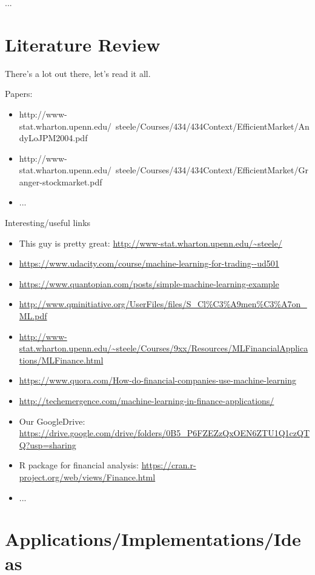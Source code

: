 \documentclass[12pt, oneside]{article}
\begin{document}
...

\section{Literature Review}

There's a lot out there, let's read it all.

Papers: 
\begin{itemize}
\item http://www-stat.wharton.upenn.edu/~steele/Courses/434/434Context/EfficientMarket/AndyLoJPM2004.pdf

\item http://www-stat.wharton.upenn.edu/~steele/Courses/434/434Context/EfficientMarket/Granger-stockmarket.pdf

\item ...
\end{itemize}

Interesting/useful links
\begin{itemize}
\item This guy is pretty great: \url{http://www-stat.wharton.upenn.edu/~steele/}
\item \url{https://www.udacity.com/course/machine-learning-for-trading--ud501}
\item \url{https://www.quantopian.com/posts/simple-machine-learning-example}
\item \url{http://www.qminitiative.org/UserFiles/files/S_Cl\%C3\%A9men\%C3\%A7on_ML.pdf}
\item \url{http://www-stat.wharton.upenn.edu/~steele/Courses/9xx/Resources/MLFinancialApplications/MLFinance.html}
\item \url{https://www.quora.com/How-do-financial-companies-use-machine-learning}
\item \url{http://techemergence.com/machine-learning-in-finance-applications/}
\item Our GoogleDrive: \url{https://drive.google.com/drive/folders/0B5_P6FZEZzQxOEN6ZTU1Q1czQTQ?usp=sharing}
\item R package for financial analysis: \url{https://cran.r-project.org/web/views/Finance.html}

\item ...

\end{itemize}

\section{Applications/Implementations/Ideas}
\end{document}
